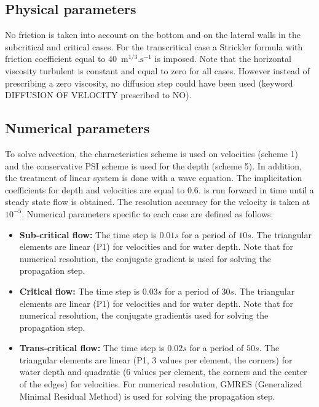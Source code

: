 \subsection{Physical parameters}

No friction is taken into account on the bottom and on the lateral walls in the subcritical and critical cases.
For the transcritical case a Strickler formula with friction coefficient
equal to 40~$\text{m}^{1/3}.\text{s}^{-1}$ is imposed.
Note that the horizontal viscosity turbulent is constant and equal to zero for all cases.
However instead of prescribing a zero viscosity, no diffusion step could
have been used (keyword DIFFUSION OF VELOCITY prescribed to NO).

\subsection{Numerical parameters}

To solve advection,
the characteristics scheme is used on velocities (scheme 1) and
the conservative PSI scheme is used for the depth (scheme 5).
In addition, the treatment of linear system is done with a wave equation.
The implicitation coefficients for depth and velocities are equal to 0.6.
 is run
forward in time until a steady state flow is obtained. The resolution accuracy for the velocity is taken at $10^{-5}$.
Numerical parameters specific to each case are defined as follows:
\begin{itemize}
\item {\bf Sub-critical flow:} 
The time step is $0.01s$ for a period of $10s$.
The triangular elements are linear (P1) for velocities and for water depth.
Note that for numerical resolution, the conjugate gradient 
is used for solving the propagation step. 


\item {\bf Critical flow:}
The time step is $0.03s$ for a period of $30s$. 
The triangular elements are linear (P1) for velocities and for water depth.
Note that for numerical resolution, the conjugate gradientis used for solving the propagation step.

\item {\bf Trans-critical flow:}
The time step is $0.02s$ for a period of $50s$. 
The triangular elements are linear 
(P1, 3 values per element, the corners) for water depth and
quadratic (6 values per element, the corners and the center of the edges)
for velocities.
For numerical resolution, GMRES (Generalized Minimal Residual Method)
is used for solving the propagation step. 

\end{itemize}




